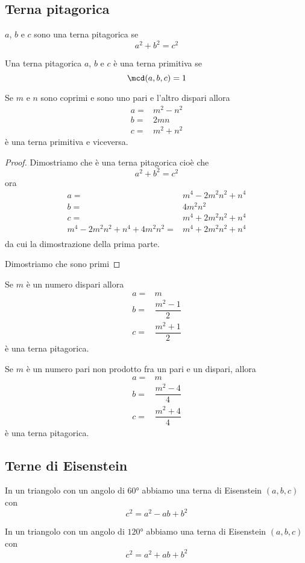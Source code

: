 \subsection{Terna pitagorica}
\begin{defn}
$a$, $b$ e $c$ sono una terna pitagorica se \[a^2+b^2=c^2\]
\end{defn}
\begin{defn}
Una terna pitagorica  $a$, $b$ e $c$ è una terna primitiva se
\[\mcd(a,b,c)=1\]
\end{defn}
\begin{thm}
	Se $m$ e $n$ sono coprimi e sono uno pari e l'altro dispari allora
	\begin{align*}
	a=&m^2-n^2\\
	b=&2mn\\
	c=&m^2+n^2
	\end{align*}
	è una terna primitiva e viceversa. 
\end{thm}
\begin{proof}
	Dimostriamo che è una terna pitagorica cioè che \[a^2+b^2=c^2\]
	ora 
		\begin{align*}
	a=&m^4-2m^2n^2+n^4\\
	b=&4m^2n^2\\
	c=&m^4+2m^2n^2+n^4\\
	m^4-2m^2n^2+n^4+4m^2n^2=&m^4+2m^2n^2+n^4\\
	\end{align*}
	da cui la dimostrazione della prima parte. 
	
	Dimostriamo che sono primi
\end{proof}
\begin{thm}
	Se $m$ è un numero dispari allora
		\begin{align*}
	a=&m\\
	b=&\dfrac{m^2-1}{2} \\
	c=&\dfrac{m^2+1}{2}
	\end{align*}
	è una terna pitagorica.\par
		Se $m$ è un numero pari non prodotto fra un pari e un dispari, allora
	\begin{align*}
	a=&m\\
	b=&\dfrac{m^2-4}{4} \\
	c=&\dfrac{m^2+4}{4}
	\end{align*}
		è una terna pitagorica.
\end{thm}
\subsection{Terne di Eisenstein}
In un triangolo con un angolo  di $\ang{60}$
abbiamo una terna di Eisenstein $(a,b,c)$ con
\begin{equation*}
	c^2=a^2-ab+b^2
\end{equation*}

In un triangolo con un angolo  di $\ang{120}$
abbiamo una terna di Eisenstein $(a,b,c)$ con
\begin{equation*}
	c^2=a^2+ab+b^2
\end{equation*}